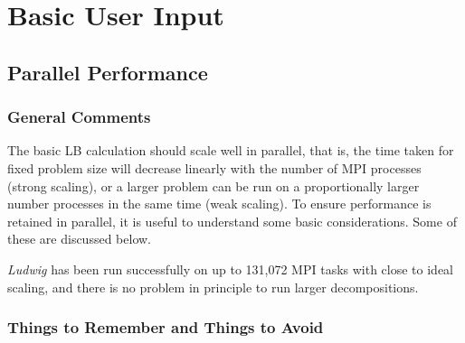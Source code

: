 %
%
%
%
%
%

\section{Basic User Input}

\subsection{Parallel Performance}

\subsubsection{General Comments}

The basic LB calculation should scale well in parallel, that is,
the time taken for fixed problem size will decrease linearly
with the number of MPI processes (strong scaling), or a larger
problem can be run on a proportionally larger number processes
in the same time (weak scaling). To ensure performance is retained
in parallel, it is useful to understand some basic considerations.
Some of these are discussed below.

\textit{Ludwig} has been run successfully on up to 131,072 MPI
tasks with close to ideal scaling, and there is no problem in
principle to run larger decompositions.

\subsubsection{Things to Remember and Things to Avoid}
\label{section-advice}

